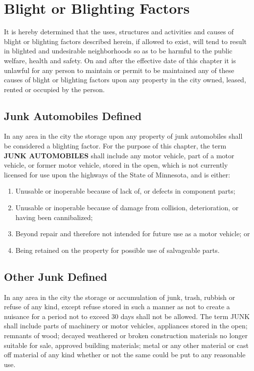 \section{Blight or Blighting Factors}
It is hereby determined that the uses, structures and activities and causes of blight or blighting factors described herein, if allowed to exist, will tend to result in blighted and undesirable neighborhoods so as to be harmful to the public welfare, health and safety. On and after the effective date of this chapter it is unlawful for any person to maintain or permit to be maintained any of these causes of blight or blighting factors upon any property in the city owned, leased, rented or occupied by the person.
\subsection{Junk Automobiles Defined}
In any area in the city the storage upon any property of junk automobiles shall be considered a blighting factor. For the purpose of this chapter, the term \textbf{JUNK AUTOMOBILES} shall include any motor vehicle, part of a motor vehicle, or former motor vehicle, stored in the open, which is not currently licensed for use upon the highways of the State of Minnesota, and is either:
\begin{enumerate}[{\indent}1)]
    \item Unusable or inoperable because of lack of, or defects in component parts;
    \item Unusable or inoperable because of damage from collision, deterioration, or having been cannibalized;
    \item Beyond repair and therefore not intended for future use as a motor vehicle; or 
    \item Being retained on the property for possible use of salvageable parts.
\end{enumerate}
\subsection{Other Junk Defined}
In any area in the city the storage or accumulation of junk, trash, rubbish or refuse of any kind, except refuse stored in such a manner as not to create a nuisance for a period not to exceed 30 days shall not be allowed. The term JUNK shall include parts of machinery or motor vehicles, appliances stored in the open; remnants of wood; decayed weathered or broken construction materials no longer suitable for sale, approved building materials; metal or any other material or cast off material of any kind whether or not the same could be put to any reasonable use.
